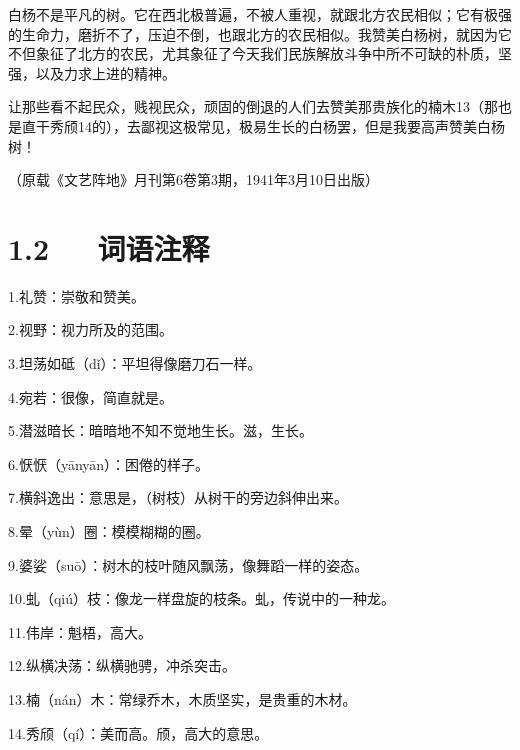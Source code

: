 \documentclass[letterpaper,12pt,english]{sphinxmanual}
\begin{document}
白杨不是平凡的树。它在西北极普遍，不被人重视，就跟北方农民相似；它有极强的生命力，磨折不了，压迫不倒，也跟北方的农民相似。我赞美白杨树，就因为它不但象征了北方的农民，尤其象征了今天我们民族解放斗争中所不可缺的朴质，坚强，以及力求上进的精神。

让那些看不起民众，贱视民众，顽固的倒退的人们去赞美那贵族化的楠木13（那也是直干秀颀14的），去鄙视这极常见，极易生长的白杨罢，但是我要高声赞美白杨树！

（原载《文艺阵地》月刊第6卷第3期，1941年3月10日出版）


\section{1.2   词语注释}
\label{\detokenize{p01_u6563_u6587/_u8305_u76fe-_u767d_u6768_u793c_u8d5e:id4}}
1.礼赞：崇敬和赞美。

2.视野：视力所及的范围。

3.坦荡如砥（dǐ）：平坦得像磨刀石一样。

4.宛若：很像，简直就是。

5.潜滋暗长：暗暗地不知不觉地生长。滋，生长。

6.恹恹（yānyān）：困倦的样子。

7.横斜逸出：意思是，（树枝）从树干的旁边斜伸出来。

8.晕（yùn）圈：模模糊糊的圈。

9.婆娑（suō）：树木的枝叶随风飘荡，像舞蹈一样的姿态。

10.虬（qiú）枝：像龙一样盘旋的枝条。虬，传说中的一种龙。

11.伟岸：魁梧，高大。

12.纵横决荡：纵横驰骋，冲杀突击。

13.楠（nán）木：常绿乔木，木质坚实，是贵重的木材。

14.秀颀（qí）：美而高。颀，高大的意思。
\end{document}
